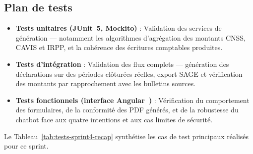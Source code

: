 \subsection{Plan de tests}

\begin{itemize}[label=\textbullet, leftmargin=0.6cm]
    \item \textbf{Tests unitaires (JUnit~5, Mockito)} : Validation des
    services de génération --- notamment les algorithmes d'agrégation
    des montants CNSS, CAVIS et IRPP, et la cohérence des écritures
    comptables produites.
    \item \textbf{Tests d'intégration} : Validation des flux complets ---
    génération des déclarations sur des périodes clôturées réelles,
    export SAGE et vérification des montants par rapprochement avec
    les bulletins sources.
    \item \textbf{Tests fonctionnels (interface Angular~\cite{angular})} : Vérification
    du comportement des formulaires, de la conformité des PDF générés,
    et de la robustesse du chatbot face aux quatre intentions et aux
    cas limites de sécurité.
\end{itemize}

\vspace{0.4cm}
Le Tableau~\ref{tab:tests-sprint4-recap} synthétise les cas de test principaux
réalisés pour ce sprint.

